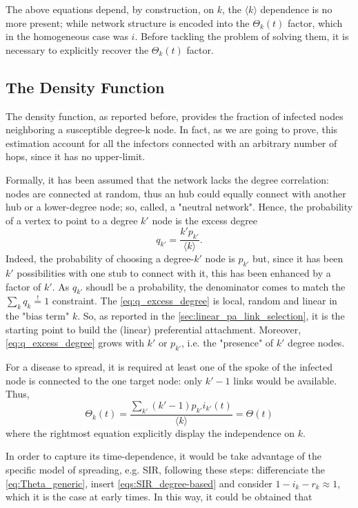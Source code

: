 \documentclass[a4paper,10pt,twoside]{book} %
\theoremstyle{definition}
\begin{document}
The above equations depend, by construction, on $k$, the $\langle k \rangle$ dependence is no more present; while network structure is encoded into the $\Theta_k(t)$ factor, which in the homogeneous case was $i$.
Before tackling the problem of solving them, it is necessary to explicitly recover the $\Theta_k(t)$ factor.

\subsection*{The Density Function}
The density function, as reported before, provides the fraction of infected nodes neighboring a susceptible degree-k node. In fact, as we are going to prove, this estimation account for all the infectors connected with an arbitrary number of hops, since it has no upper-limit. 

Formally, it has been assumed that the network lacks the degree correlation: nodes are connected at random, thus an hub could equally connect with another hub or a lower-degree node; so, called, a "neutral network". Hence, the probability of a vertex to point to a degree $k'$ node is the excess degree
\begin{equation}
	q_{k'} = \frac{k' p_{k'}}{\langle k \rangle}
	\label{eq:q_excess_degree}
	.
\end{equation}
Indeed, the probability of choosing a degree-$k'$ node is $p_{k'}$ but, since it has been $k'$ possibilities with one stub to connect with it, this has been enhanced by a factor of $k'$. As $q_{k'}$ shoudl be a probability, the denominator comes to match the $\sum_k q_k \stackrel{!}{=} 1$ constraint.
The \autoref{eq:q_excess_degree} is local, random and linear in the "bias term" $k$. So, as reported in the \autoref{sec:linear_pa_link_selection}, it is the starting point to build the (linear) preferential attachment. Moreover, \autoref{eq:q_excess_degree} grows with $k'$ or $p_{k'}$, i.e. the "presence" of $k'$ degree nodes.

For a disease to spread, it is required at least one of the spoke of the infected node is connected to the one target node: only $k'-1$ links would be available.
Thus,
\begin{equation}
	\Theta_k(t) = \frac{\sum_{k'} (k'-1)p_{k'}i_{k'}(t)}{\langle k \rangle} = \Theta(t)
	\label{eq:Theta_generic}
\end{equation}
where the rightmost equation explicitly display the independence on $k$.

In order to capture its time-dependence, it would be take advantage of the specific model of spreading, e.g. SIR, following these steps: differenciate the \autoref{eq:Theta_generic}, insert \autoref{eqs:SIR_degree-based} and consider $1-i_k-r_k \approx 1$, which it is the case at early times. In this way, it could be obtained that \cite{barabasi::2016networkbook}
\end{document}
